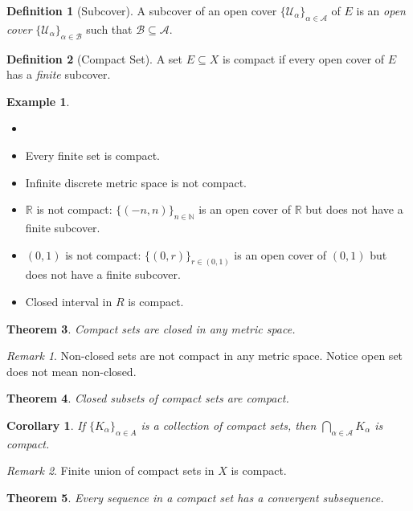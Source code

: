 \documentclass[12pt, lettersize]{book}
\theoremstyle{plain}
\newtheorem{thm}{Theorem}[section]
\newtheorem{cor}{Corollary}[thm]
\theoremstyle{definition}
\newtheorem{dfn}[thm]{Definition}
\newtheorem*{eg}{Example}
\theoremstyle{remark}
\newtheorem*{rem}{Remark}
\newcommand{\R}{\mathbb{R}}
\newcommand{\N}{\mathbb{N}}
\begin{document}
	\begin{dfn}[Subcover]
		A subcover of an open cover $\{\mathcal{U}_\alpha\}_{\alpha\in\mathcal{A}}$ of $E$ is an \emph{open cover} $\{\mathcal{U}_\alpha\}_{\alpha\in\mathcal{B}}$ such that $\mathcal{B}\subseteq\mathcal{A}$.
	\end{dfn}
	
	\begin{dfn}[Compact Set]
		A set $E\subseteq X$ is compact if every open cover of $E$ has a \emph{finite} subcover.
	\end{dfn}
	\begin{eg}
		\begin{itemize}
			\item[]
			\item Every finite set is compact.
			\item Infinite discrete metric space is not compact.
			\item $\R$ is not compact: $\{(-n,n)\}_{n\in\N}$ is an open cover of $\R$ but does not have a finite subcover.
			\item $(0,1)$ is not compact: $\{(0,r)\}_{r\in(0,1)} $ is an open cover of $(0,1)$ but does not have a finite subcover.
			\item Closed interval in $R$ is compact.
		\end{itemize}
	\end{eg}
	
	\begin{thm}
		Compact sets are closed in any metric space.
	\end{thm}
	\begin{rem}
		Non-closed sets are not compact in any metric space. Notice open set does not mean non-closed.
	\end{rem}
	
	\begin{thm}
		Closed subsets of compact sets are compact.
	\end{thm}
	\begin{cor}
		If $\{K_\alpha\}_{\alpha\in A}$ is a collection of compact sets, then $\bigcap_{\alpha\in\mathcal{A}}K_\alpha$ is compact.
	\end{cor}

	\begin{rem}
		Finite union of compact sets in $X$ is compact.
	\end{rem}
	
	\begin{thm}
		Every sequence in a compact set has a convergent subsequence.
	\end{thm}
	
\end{document}
